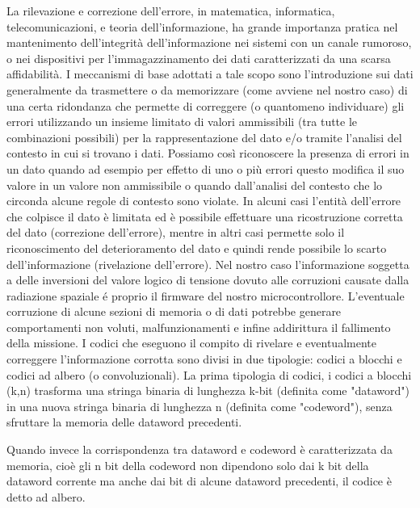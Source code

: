 \documentclass[LaM,binding=0.6cm]{../sapthesis}
\begin{document}
La rilevazione e correzione dell'errore, in matematica, informatica, telecomunicazioni, e teoria dell'informazione, ha grande importanza pratica nel mantenimento dell'integrità dell'informazione nei sistemi con un canale rumoroso, o nei dispositivi per l'immagazzinamento dei dati caratterizzati da una scarsa affidabilità.
\newline
I meccanismi di base adottati a tale scopo sono l'introduzione sui dati generalmente da trasmettere o da memorizzare (come avviene nel nostro caso) di una certa ridondanza che permette di correggere (o quantomeno individuare) gli errori utilizzando un insieme limitato di valori ammissibili (tra tutte le combinazioni possibili) per la rappresentazione del dato e/o tramite l'analisi del contesto in cui si trovano i dati. 
\newline
Possiamo così riconoscere la presenza di errori in un dato quando ad esempio per effetto di uno o più errori questo modifica il suo valore in un valore non ammissibile o quando dall'analisi del contesto che lo circonda alcune regole di contesto sono violate. In alcuni casi l'entità dell'errore che colpisce il dato è limitata ed è possibile effettuare una ricostruzione corretta del dato (correzione dell'errore), mentre in altri casi permette solo il riconoscimento del deterioramento del dato e quindi rende possibile lo scarto dell'informazione (rivelazione dell'errore).
\newline
Nel nostro caso l'informazione soggetta a delle inversioni del valore logico di tensione dovuto alle corruzioni causate dalla radiazione spaziale é proprio il firmware del nostro microcontrollore. L'eventuale corruzione di alcune sezioni di memoria o di dati potrebbe generare comportamenti non voluti, malfunzionamenti e infine addirittura il fallimento della missione.
\newline
I codici che eseguono il compito di rivelare e eventualmente correggere l'informazione corrotta sono divisi in due tipologie: codici a blocchi e codici ad albero (o convoluzionali).
La prima tipologia di codici, i codici a blocchi (k,n)  trasforma una stringa binaria di lunghezza k-bit (definita come "dataword") in una nuova stringa binaria di lunghezza n (definita come "codeword"), senza sfruttare la memoria delle dataword precedenti.

Quando invece la corrispondenza tra dataword e codeword è caratterizzata da memoria, cioè gli n bit della codeword non dipendono solo dai k bit della dataword corrente ma anche dai bit di alcune dataword precedenti, il codice è detto ad albero.
\end{document}
